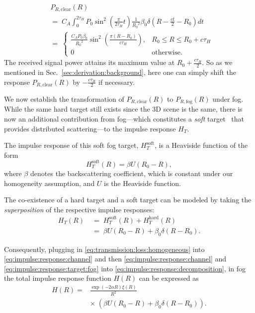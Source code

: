 \documentclass[10pt,twocolumn,letterpaper]{article}
\begin{document}
{\scriptsize
\begin{align}
    &P_{R,\text{clear}}(R) \nonumber \\
    &{=}\;C_A \displaystyle\int_0^{2\tau_H} P_0 \sin^2\left(\frac{\pi}{2\tau_H}t\right) \frac{1}{{R_0}^2} \beta_0 \delta(R-\frac{ct}{2}-R_0) dt \nonumber \\
    &{=}\;\left\{\begin{array}{rl}
        \frac{C_A P_0 \beta_0}{{R_0}^2} \sin^2\left(\frac{\pi(R-R_0)}{c\tau_H}\right), & R_0 \leq R \leq R_0+c\tau_H \\
        0 & \text{otherwise}.
    \end{array}\right. \label{eq:response:clear}
\end{align}
}The received signal power attains its maximum value at $R_0+\frac{c\tau_H}{2}$. So as we mentioned in Sec.~\ref{sec:derivation:background}, here one can simply shift the response $P_{R,\text{clear}}(R)$ by $-\frac{c\tau_H}{2}$ if necessary.

We now establish the transformation of $P_{R,\text{clear}}(R)$ to $P_{R,\text{fog}}(R)$ under fog. While the same hard target still exists since the 3D scene is the same, there is now an additional contribution from fog---which constitutes a \emph{soft} target~\cite{Rasshofer_2011} that provides distributed scattering---to the impulse response $H_T$. 

The impulse response of this soft fog target, $H_T^{\text{soft}}$, is a Heaviside function of the form
\begin{equation} \label{eq:impulse:response:target:fog:soft}
    H_{T}^{\text{soft}}(R) = \beta{}U(R_0-R),
\end{equation}
where $\beta$ denotes the backscattering coefficient, which is constant under our homogeneity assumption, and $U$ is the Heaviside function. 

The co-existence of a hard target and a soft target can be modeled by taking the \emph{superposition} of the respective impulse responses:
\begin{align}
    H_T(R)\;&{=}\;H_T^{\text{soft}}(R) + H_T^{\text{hard}}(R) \nonumber\\
    &{=}\;\beta{}U(R_0-R) + \beta_0\delta(R-R_0). \label{eq:impulse:response:target:fog}
\end{align}

Consequently, plugging in \eqref{eq:transmission:loss:homogeneous} into \eqref{eq:impulse:response:channel} and then \eqref{eq:impulse:response:channel} and  \eqref{eq:impulse:response:target:fog} into \eqref{eq:impulse:response:decomposition}, in fog the total impulse response function $H(R)$ can be expressed as
\begin{align} \label{eq:impulse:response:total:fog}
    H(R) = &{\frac{\exp(-2\alpha{}R)\xi(R)}{R^2}} \nonumber \\ 
    &{\times}\;\left(\beta{}U(R_0-R) + \beta_0\delta(R-R_0)\right).
\end{align}
\end{document}

